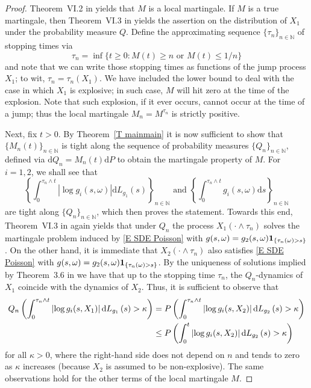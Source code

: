 \begin{proof}
Theorem~VI.2 in \citet{Bremaud_1981} yields that $M$ is a local martingale.
If $M$ is a true martingale, then Theorem~VI.3 in \citet{Bremaud_1981}
yields the assertion on the distribution of $X_{1}$ under the probability
measure $Q$. Define the approximating sequence $\{\tau _{n}\}_{n\in \mathbb{N%
}}$ of stopping times via
\begin{equation*}
\tau _{n}=\inf \{t\geq 0:M\left( t\right) \geq n\text{ or }M\left( t\right)
\leq 1/n\}
\end{equation*}%
and note that we can write those stopping times as functions of the jump process $X_1$; to wit, $\tau_n = \tau_n(X_1)$.
We have included the lower bound to deal with the case in which $X_{1}$ is
explosive; in such case, $M$ will hit zero at the time of the explosion.
Note that such explosion, if it ever occurs, cannot occur at the time of a
jump; thus the local martingale $M_{n}=M^{\tau _{n}}$ is strictly positive.

Next, fix $t>0$. By Theorem~\ref{T mainmain}
it is now sufficient to show that $\{M_{n}(t)\}_{n\in \mathbb{N}}$ is tight
along the sequence of probability measures $\{Q_{n}\}_{n\in \mathbb{N}}$,
defined via $\mathrm{d}Q_{n}=M_{n}(t)\mathrm{d}P$ to obtain the martingale property
of $M$. For $i=1,2$, we shall see that
\begin{equation*}
\left\{ \int_{0}^{\tau _{n}\wedge t}\left\vert \log g_{i}(s,\omega
)\right\vert \mathrm{d}L_{g_{1}}\left( s\right) \right\} _{n\in \mathbb{N}}%
\text{ and }\left\{ \int_{0}^{\tau _{n}\wedge t}g_{i}(s,\omega )\mathrm{d}%
s\right\} _{n\in \mathbb{N}}
\end{equation*}%
are tight along $\{Q_{n}\}_{n\in \mathbb{N}}$, which then proves the
statement. Towards this end, Theorem~VI.3 in \citet{Bremaud_1981} again
yields that under $Q_{n}$ the process $X_{1}( \cdot \wedge \tau _{n}) $
solves the martingale problem induced by \eqref{E SDE
Poisson} with $g( s,\omega ) =g_{2}( s,\omega )\mathbf{1}_{\{ \tau _{n}( \omega ) >s\}} $. On the other hand, it is
immediate that $X_{2}\left( \cdot \wedge \tau _{n}\right) $ also satisfies
\eqref{E SDE
Poisson} with $g( s,\omega ) =g_{2}( s,\omega )
\mathbf{1}_{\{ \tau _{n}( \omega ) >s\}} $. By the uniqueness of
solutions implied by Theorem~3.6 in \citet{Jacod_1975} we have that up to
the stopping time $\tau _{n}$, the $Q_{n}$-dynamics of $X_{1}$ coincide with
the dynamics of $X_{2}$. Thus, it is sufficient to observe that
\begin{align*}
Q_{n}\left( \int_{0}^{\tau _{n}\wedge t}\left\vert \log
g_{i}(s,X_{1})\right\vert \mathrm{d}L_{g_{1}}\left( s\right) >\kappa \right)
& =P\left( \int_{0}^{\tau _{n}\wedge t}\left\vert \log
g_{i}(s,X_{2})\right\vert \mathrm{d}L_{g_{2}}\left( s\right) >\kappa \right)
\\
& \leq P\left( \int_{0}^{t}\left\vert \log g_{i}(s,X_{2})\right\vert \mathrm{%
d}L_{g_{2}}\left( s\right) >\kappa \right)
\end{align*}%
for all $\kappa >0$, where the right-hand side does not depend on $n$ and
tends to zero as $\kappa $ increases (because $X_{2}$ is assumed to be
non-explosive). The same observations hold for the other terms of the local martingale $M$.
\end{proof}

